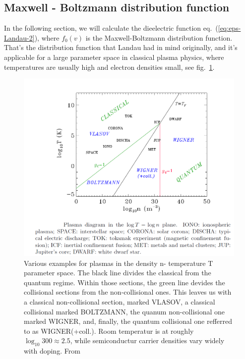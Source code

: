 \documentclass[physics,phd,nolot,nolof]{uccthesis}%
\begin{document}
\subsection{Maxwell - Boltzmann distribution function}
In the following section, we will calculate the dieelectric function eq.~(\ref{eq:eps-Landau-2}), 
where $f_0(v)$ is the Maxwell-Boltzmann distribution function. 
That's the distribution function that Landau had in mind originally,
and it's applicable for a large parameter space in classical plasma physics,
where temperatures are usually high and electron densities small, see fig.~\ref{fig:plasmaregimes}.\\
\begin{figure}[ht]
	\begin{center}
	\includegraphics[width=\textwidth]{plasma-regimes+caption.png}
	\end{center}%
	\caption{Various examples for plasmas in the density n- temperature T parameter space.
	The black line divides the classical from the quantum regime. Within those sections, the green line devides the collisional sections from the non-collisional ones. 
	This leaves us with a classical non-collisional section, marked VLASOV, a classical collisional marked BOLTZMANN, the quanum non-collisional one marked WIGNER, and, finally, the quantum collisional one refferred to as WIGNER(+coll.). Room temperatur is at roughly $\log_{10}300\approx2.5$, while semiconductur carrier densities vary widely with doping. 
	From \cite{howtomodelqmplasmas}}
	\label{fig:plasmaregimes}
\end{figure}
\end{document}
